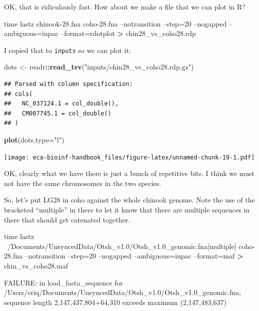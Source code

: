 \documentclass[]{krantz}
\makeatletter
\newenvironment{Shaded}{\begin{snugshade}}{\end{snugshade}}
\newcommand{\BuiltInTok}[1]{#1}
\newcommand{\DataTypeTok}[1]{\textcolor[rgb]{0.27,0.27,0.27}{#1}}
\newcommand{\ExtensionTok}[1]{#1}
\newcommand{\KeywordTok}[1]{\textcolor[rgb]{0.27,0.27,0.27}{\textbf{#1}}}
\newcommand{\NormalTok}[1]{#1}
\newcommand{\OperatorTok}[1]{\textcolor[rgb]{0.43,0.43,0.43}{\textbf{#1}}}
\newcommand{\StringTok}[1]{\textcolor[rgb]{0.5,0.5,0.5}{#1}}
\newenvironment{kframe}{%
\medskip{}
\setlength{\fboxsep}{.8em}
 \def\at@end@of@kframe{}%
 \ifinner\ifhmode%
  \def\at@end@of@kframe{\end{minipage}}%
  \begin{minipage}{\columnwidth}%
 \fi\fi%
 \def\FrameCommand##1{\hskip\@totalleftmargin \hskip-\fboxsep
 \colorbox{shadecolor}{##1}\hskip-\fboxsep
     \hskip-\linewidth \hskip-\@totalleftmargin \hskip\columnwidth}%
 \MakeFramed {\advance\hsize-\width
   \@totalleftmargin\z@ \linewidth\hsize
   \@setminipage}}%
 {\par\unskip\endMakeFramed%
 \at@end@of@kframe}
\renewenvironment{Shaded}{\begin{kframe}}{\end{kframe}}
\makeatother
\begin{document}
OK, that is ridiculously fast. How about we make a file that we can plot in R?

\begin{Shaded}
\begin{Highlighting}[]
\BuiltInTok{time}\NormalTok{ lastz chinook-28.fna coho-28.fna --notransition --step=20 --nogapped --ambiguous=iupac --format=rdotplot }\OperatorTok{>}\NormalTok{ chin28_vs_coho28.rdp}
\end{Highlighting}
\end{Shaded}

I copied that to \texttt{inputs} so we can plot it:

\begin{Shaded}
\begin{Highlighting}[]
\NormalTok{dots <-}\StringTok{ }\NormalTok{readr}\OperatorTok{::}\KeywordTok{read_tsv}\NormalTok{(}\StringTok{"inputs/chin28_vs_coho28.rdp.gz"}\NormalTok{)}
\end{Highlighting}
\end{Shaded}

\begin{verbatim}
## Parsed with column specification:
## cols(
##   NC_037124.1 = col_double(),
##   CM007745.1 = col_double()
## )
\end{verbatim}

\begin{Shaded}
\begin{Highlighting}[]
\KeywordTok{plot}\NormalTok{(dots,}\DataTypeTok{type=}\StringTok{"l"}\NormalTok{)}
\end{Highlighting}
\end{Shaded}

\texttt{[image: eca-bioinf-handbook\_files/figure-latex/unnamed-chunk-19-1.pdf]}

OK, clearly what we have there is just a bunch of repetitive bits. I think we must not have the same chromosomes in the two species.

So, let's put LG28 in coho against the whole chinook genome. Note the use of the
bracketed ``multiple'' in there to let it know that there are multiple sequences in there
that should get catenated together.

\begin{Shaded}
\begin{Highlighting}[]
\BuiltInTok{time}\NormalTok{ lastz ~/Documents/UnsyncedData/Otsh_v1.0/Otsh_v1.0_genomic.fna[multiple]  coho-28.fna --notransition --step=20 --nogapped --ambiguous=iupac --format=maf }\OperatorTok{>}\NormalTok{ chin_vs_coho28.maf}

\ExtensionTok{FAILURE}\NormalTok{: in load_fasta_sequence for /Users/eriq/Documents/UnsyncedData/Otsh_v1.0/Otsh_v1.0_genomic.fna, sequence length 2,147,437,804+64,310 exceeds maximum (2,147,483,637)}
\end{Highlighting}
\end{Shaded}
\end{document}
